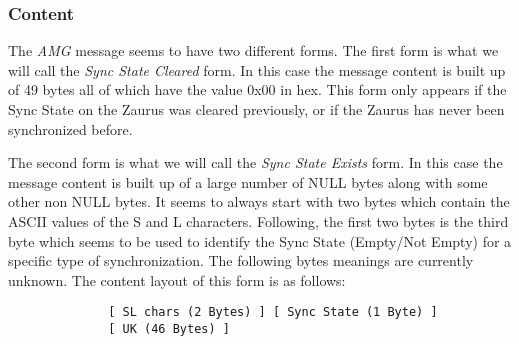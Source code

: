             \subsubsection{Content}

            The \emph{AMG} message seems to have two different forms.
            The first form is what we will call the \emph{Sync State
            Cleared} form. In this case the message content is built up
            of 49 bytes all of which have the value 0x00 in hex. This
            form only appears if the Sync State on the Zaurus was
            cleared previously, or if the Zaurus has never been
            synchronized before.

            The second form is what we will call the \emph{Sync State
            Exists} form. In this case the message content is built up
            of a large number of NULL bytes along with some other non
            NULL bytes. It seems to always start with two bytes which
            contain the ASCII values of the S and L characters.
            Following, the first two bytes is the third byte which seems
            to be used to identify the Sync State (Empty/Not Empty) for
            a specific type of synchronization. The following bytes
            meanings are currently unknown. The content layout of this
            form is as follows:

            \begin{verbatim}
              [ SL chars (2 Bytes) ] [ Sync State (1 Byte) ]
              [ UK (46 Bytes) ]
            \end{verbatim}

